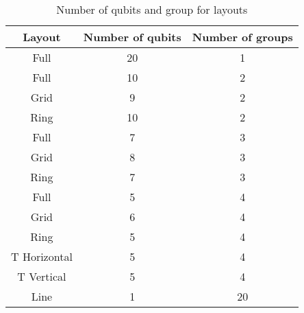 \begin{table}[htb]
\centering
\caption{Number of qubits and group for layouts}
\label{tab:layout-qubit-group}
\begin{tabular}{|c|c|c|} 
\hline
\textbf{Layout} & \textbf{Number of qubits} & \textbf{Number of groups}  \\ 
\hline
Full            & 20                        & 1                         \\ 
\hline
Full            & 10                        & 2                         \\ 
\hline
Grid            & 9                         & 2                         \\ 
\hline
Ring            & 10                        & 2                         \\ 
\hline
Full            & 7                         & 3                         \\ 
\hline
Grid            & 8                         & 3                         \\ 
\hline
Ring            & 7                         & 3                         \\ 
\hline
Full            & 5                         & 4                         \\ 
\hline
Grid            & 6                         & 4                         \\ 
\hline
Ring            & 5                         & 4                         \\ 
\hline
T Horizontal    & 5                         & 4                         \\ 
\hline
T Vertical      & 5                         & 4                         \\ 
\hline
Line            & 1                         & 20                        \\
\hline
\end{tabular}
\end{table}